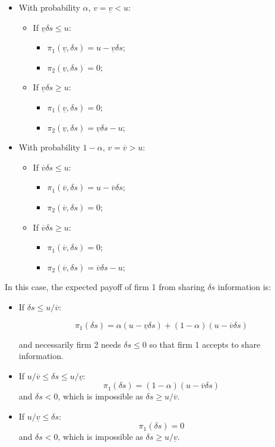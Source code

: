 \documentclass[a4paper,leqno]{article}%
\renewcommand{\a}{\alpha}
\newcommand{\uv}{\underline{v}}
\newcommand{\ov}{\overline{v}}
\begin{document}
%
\begin{itemize}
    \item With probability $\a$, $v=\uv<u$:
\begin{itemize}
    \item If $\uv \delta s\leq u$:
\begin{itemize}
    \item $\pi_1(\uv,\delta s)=u-\uv \delta s$;
    \item $\pi_2(\uv,\delta s)=0$;
\end{itemize}    
    \item If $\uv \delta s\geq u$:
\begin{itemize}
    \item $\pi_1(\uv,\delta s)=0$;
    \item $\pi_2(\uv,\delta s)=\uv\delta s-u$;
\end{itemize}
\end{itemize}
    \item With probability $1-\a$, $v=\ov>u$:
\begin{itemize}
    \item If $\ov \delta s\leq u$:
\begin{itemize}
    \item $\pi_1(\ov,\delta s)=u-\ov \delta s$;
    \item $\pi_2(\ov,\delta s)=0$;
\end{itemize}    
    \item If $\ov \delta s\geq u$:
\begin{itemize}
    \item $\pi_1(\ov,\delta s)=0$;
    \item $\pi_2(\ov,\delta s)=\ov\delta s-u$;
\end{itemize}
\end{itemize}
\end{itemize}

In this case, the expected payoff of firm 1 from sharing $\delta s$ information is:

\begin{itemize}
    \item If $\delta s\leq u/\ov$:
    
    $$\pi_1(\delta s)=\a(u-\uv \delta s)+(1-\a)(u-\ov \delta s)$$
    
    and necessarily  firm 2 needs $\delta s\leq0$ so that firm 1 accepts to share information.
    \item If $u/\ov\leq \delta s\leq u/\uv$:
    $$\pi_1(\delta s)=(1-\a)(u-\ov \delta s)$$
    and $\delta s<0$, which is impossible as $\delta s\geq u/\ov$.
    \item If $u/\uv\leq \delta s$:
    $$\pi_1(\delta s)=0$$
    and $\delta s<0$, which is impossible as $\delta s\geq u/\uv$.
\end{itemize}
\end{document}
